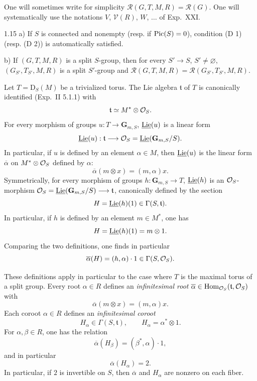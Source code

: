 One will sometimes write for simplicity $\mathscr R(G,T,M,R)=\mathscr R(G)$. One will systematically use the notations $V$, $\mathcal V(R)$, $W$, $\ldots$ of Exp.~XXI.
\begin{remark}{1.15}\label{XXII.1.15}
a) If $S$ is connected and nonempty (resp. if $\operatorname{Pic}(S)=0$), condition (D 1) (resp. (D 2)) is automatically satisfied.

b) If $(G,T,M,R)$ is a split $S$-group, then for every $S'\to S$, $S'\ne\varnothing$, $(G_{S'},T_{S'},M,R)$ is a split $S'$-group and $\mathscr R(G,T,M,R)=\mathscr R(G_{S'},T_{S'},M,R)$.
\end{remark}
\label{XXII.1.16}
Let $T=\mathrm D_S(M)$ be a trivialized torus. The Lie algebra $\mathfrak t$ of $T$ is canonically identified (Exp.~II 5.1.1) with
\[
\mathfrak t\simeq M^*\otimes\mathcal{O}_S.
\]
For every morphism of groups $u:T\to\mathbf G_{m,S}$, $\underline{\operatorname{Lie}}(u)$ is a linear form
\[
\underline{\operatorname{Lie}}(u):\mathfrak t\longrightarrow\mathcal{O}_S=\underline{\operatorname{Lie}}(\mathbf G_{m,S}/S).
\]
In particular, if $u$ is defined by an element $\alpha\in M$, then $\underline{\operatorname{Lie}}(u)$ is the linear form $\overline\alpha$ on $M^*\otimes\mathcal{O}_S$ defined by $\alpha$:
\[
\overline\alpha(m\otimes x)=(m,\alpha)x.
\]
Symmetrically, for every morphism of groups $h:\mathbf G_{m,S}\to T$, $\underline{\operatorname{Lie}}(h)$ is an $\mathcal{O}_S$-morphism $\mathcal{O}_S=\underline{\operatorname{Lie}}(\mathbf G_{m,S}/S)\longrightarrow\mathfrak t$, canonically defined by the section
\[
H=\underline{\operatorname{Lie}}(h)(1)\in\Gamma(S,\mathfrak t).
\]
In particular, if $h$ is defined by an element $m\in M^*$, one has
\[
H=\underline{\operatorname{Lie}}(h)(1)=m\otimes1.
\]
Comparing the two definitions, one finds in particular
\[
\overline\alpha(H)=(h,\alpha)\cdot1\in\Gamma(S,\mathcal{O}_S).
\]

\label{XXII.1.17}
These definitions apply in particular to the case where $T$ is the maximal torus of a split group. Every root $\alpha\in R$ defines an \emph{infinitesimal root} $\overline\alpha\in\operatorname{Hom}_{\mathcal{O}_S}(\mathfrak t,\mathcal{O}_S)$ with
\[
\overline\alpha(m\otimes x)=(m,\alpha)x.
\]
Each coroot $\alpha\in R$ defines an \emph{infinitesimal coroot}
\[
H_\alpha\in\Gamma(S,\mathfrak t),\qquad H_\alpha=\alpha^*\otimes1.
\]
For $\alpha,\beta\in R$, one has the relation
\[
\overline\alpha(H_\beta)=(\beta^*,\alpha)\cdot1,
\]
and in particular
\[
\overline\alpha(H_\alpha)=2.
\]
In particular, if $2$ is invertible on $S$, then $\overline\alpha$ and $H_\alpha$ are nonzero on each fiber.

